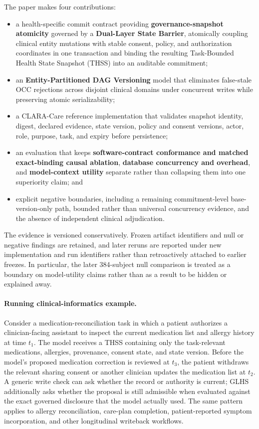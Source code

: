 \documentclass[11pt]{article}
\begin{document}
The paper makes four contributions:
\begin{itemize}
  \item a health-specific commit contract providing \textbf{governance-snapshot atomicity} governed by a \textbf{Dual-Layer State Barrier}, atomically coupling clinical entity mutations with stable consent, policy, and authorization coordinates in one transaction and binding the resulting Task-Bounded Health State Snapshot (THSS) into an auditable commitment;
  \item an \textbf{Entity-Partitioned DAG Versioning} model that eliminates false-stale OCC rejections across disjoint clinical domains under concurrent writes while preserving atomic serializability;
  \item a CLARA-Care reference implementation that validates snapshot identity, digest, declared evidence, state version, policy and consent versions, actor, role, purpose, task, and expiry before persistence;
  \item an evaluation that keeps \textbf{software-contract conformance and matched exact-binding causal ablation}, \textbf{database concurrency and overhead}, and \textbf{model-context utility} separate rather than collapsing them into one superiority claim; and
  \item explicit negative boundaries, including a remaining commitment-level base-version-only path, bounded rather than universal concurrency evidence, and the absence of independent clinical adjudication.
\end{itemize}

The evidence is versioned conservatively. Frozen artifact identifiers and null or negative findings are retained, and later reruns are reported under new implementation and run identifiers rather than retroactively attached to earlier freezes. In particular, the later 384-subject null comparison is treated as a boundary on model-utility claims rather than as a result to be hidden or explained away.

\paragraph{Running clinical-informatics example.} Consider a medication-reconciliation task in which a patient authorizes a clinician-facing assistant to inspect the current medication list and allergy history at time $t_1$. The model receives a THSS containing only the task-relevant medications, allergies, provenance, consent state, and state version. Before the model's proposed medication correction is reviewed at $t_3$, the patient withdraws the relevant sharing consent or another clinician updates the medication list at $t_2$. A generic write check can ask whether the record or authority is current; GLHS additionally asks whether the proposal is still admissible when evaluated against the exact governed disclosure that the model actually used. The same pattern applies to allergy reconciliation, care-plan completion, patient-reported symptom incorporation, and other longitudinal writeback workflows.
\end{document}

